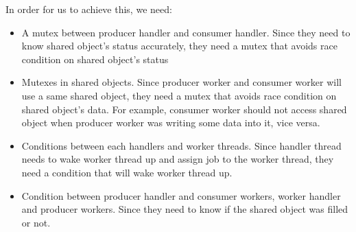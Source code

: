 \documentclass{homework}
\begin{document}
In order for us to achieve this, we need:
\begin{itemize}
    \item A mutex between producer handler and consumer handler. Since they need to know shared object’s status accurately, they need a mutex that avoids race condition on shared object’s status
    \item Mutexes in shared objects. Since producer worker and consumer worker will use a same shared object, they need a mutex that avoids race condition on shared object’s data. For example, consumer worker should not access shared object when producer worker was writing some data into it, vice versa.
    \item Conditions between each handlers and worker threads. Since handler thread needs to wake worker thread up and assign job to the worker thread, they need a condition that will wake worker thread up.
    \item Condition between producer handler and consumer workers, worker handler and producer workers. Since they need to know if the shared object was filled or not.
\end{itemize}
\end{document}
